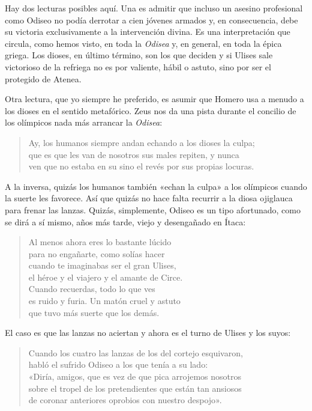 Hay dos lecturas posibles aquí. Una es admitir que incluso un asesino profesional como Odiseo no podía derrotar a cien jóvenes armados y, en consecuencia, debe su victoria exclusivamente a la intervención divina. Es una interpretación que circula, como hemos visto, en toda la \emph{Odisea} y, en general, en toda la épica griega. Los dioses, en último término, son los que deciden y si Ulises sale victorioso de la refriega no es por valiente, hábil o astuto, sino por ser el protegido de Atenea.

Otra lectura, que yo siempre he preferido, es asumir que Homero usa a menudo a los dioses en el sentido metafórico. Zeus nos da una pista durante el concilio de los olímpicos nada más arrancar la \emph{Odisea}:

\begin{verse}
Ay, los humanos siempre andan echando a los dioses la culpa;\\
que es que les van de nosotros sus males repiten, y nunca\\
ven que no estaba en su sino el revés por sus propias locuras.
\end{verse}

A la inversa, quizás los humanos también «echan la culpa» a los olímpicos cuando la suerte les favorece. Así que quizás no hace falta recurrir a la diosa ojiglauca para frenar las lanzas. Quizás, simplemente, Odiseo es un tipo afortunado, como se dirá a sí mismo, años más tarde, viejo y desengañado en Ítaca:

\begin{verse}
Al menos ahora eres lo bastante lúcido\\
para no engañarte, como solías hacer\\
cuando te imaginabas ser el gran Ulises,\\
el héroe y el viajero y el amante de Circe.\\
Cuando recuerdas, todo lo que ves\\
es ruido y furia. Un matón cruel y astuto\\
que tuvo más suerte que los demás.
\end{verse}

El caso es que las lanzas no aciertan y ahora es el turno de Ulises y los suyos:

\begin{verse}
Cuando los cuatro las lanzas de los del cortejo esquivaron,\\
habló el sufrido Odiseo a los que tenía a su lado:\\
«Diría, amigos, que es vez de que pica arrojemos nosotros\\
sobre el tropel de los pretendientes que están tan ansiosos\\
de coronar anteriores oprobios con nuestro despojo».
\end{verse}

